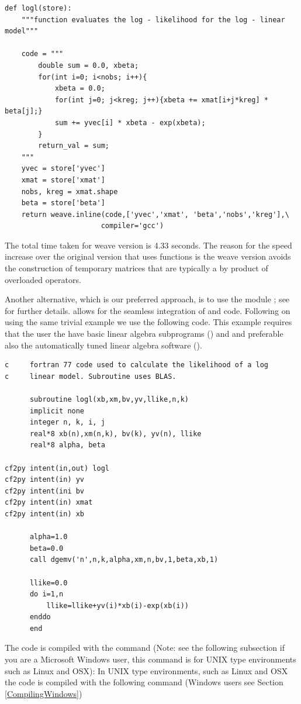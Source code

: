 \documentclass[article]{jss}
\begin{document}
\begin{lstlisting}[basicstyle={\scriptsize}]
def logl(store):
    """function evaluates the log - likelihood for the log - linear model"""

    code = """     
		double sum = 0.0, xbeta;
		for(int i=0; i<nobs; i++){
			xbeta = 0.0;
			for(int j=0; j<kreg; j++){xbeta += xmat[i+j*kreg] * beta[j];}
			sum += yvec[i] * xbeta - exp(xbeta);
		}     
		return_val = sum;
    """
    yvec = store['yvec']
    xmat = store['xmat']
	nobs, kreg = xmat.shape
	beta = store['beta']
    return weave.inline(code,['yvec','xmat', 'beta','nobs','kreg'],\ 
                       compiler='gcc')
\end{lstlisting}


The total time taken for weave version is 4.33 seconds. The reason for
the speed increase over the original version that uses \pkg{Numpy}
functions is the weave version avoids the construction of temporary
matrices that are typically a by product of overloaded operators.

Another alternative, which is our preferred approach, is to use the
\proglang{Python} module ; see \citet{F2PY} for further
details. \pkg{F2py} allows for the seamless integration of
 and  code. Following on using the
same trivial example we use the following \proglang{Fortran77} code.
This example requires that the user the have basic linear algebra
subprograms (\pkg{BLAS}) and and preferable also the automatically
tuned
linear algebra software ().\\
 
\begin{lstlisting}[basicstyle={\scriptsize}]
c     fortran 77 code used to calculate the likelihood of a log
c     linear model. Subroutine uses BLAS.

      subroutine logl(xb,xm,bv,yv,llike,n,k)
      implicit none
      integer n, k, i, j
      real*8 xb(n),xm(n,k), bv(k), yv(n), llike
      real*8 alpha, beta

cf2py intent(in,out) logl
cf2py intent(in) yv
cf2py intent(ini bv
cf2py intent(in) xmat 
cf2py intent(in) xb 

      alpha=1.0
      beta=0.0
      call dgemv('n',n,k,alpha,xm,n,bv,1,beta,xb,1)

      llike=0.0
      do i=1,n
          llike=llike+yv(i)*xb(i)-exp(xb(i))
      enddo
      end
\end{lstlisting}


The code is compiled with the command (Note: see the following
subsection if you are a Microsoft Windows user, this command is for
UNIX type environments such as Linux and OSX):
In UNIX type environments, such as Linux and OSX the code is compiled with the following command (Windows
users see Section \ref{CompilingWindows})
\end{document}
